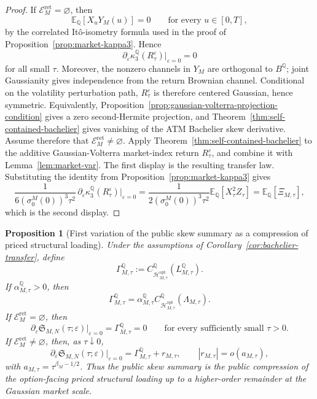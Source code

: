 \documentclass[11pt,a4paper]{amsart}
\theoremstyle{plain}
\newtheorem{proposition}[theorem]{Proposition}
\theoremstyle{definition}
\theoremstyle{remark}
\newcommand{\QQ}{\mathbb{Q}}
\newcommand{\EE}{\mathbb{E}}
\newcommand{\cH}{\mathcal{H}}
\newcommand{\cE}{\mathcal{E}}
\begin{document}
\begin{proof}
If \(\cE_M^{\mathrm{ret}}=\varnothing\), then
\[
        \EE_\QQ[X_uY_M(u)]=0
        \qquad
        \text{for every }u\in[0,T],
\]
by the correlated It\^o-isometry formula used in the proof of
Proposition~\ref{prop:market-kappa3}.  Hence
\[
        \partial_\varepsilon\kappa_3^\QQ(R_\tau^\varepsilon)\big|_{\varepsilon=0}=0
\]
for all small \(\tau\).  Moreover, the nonzero channels in \(Y_M\) are orthogonal to
\(B^\QQ\); joint Gaussianity gives independence from the return Brownian channel.  Conditional on
the volatility perturbation path, \(R_\tau^\varepsilon\) is therefore centered Gaussian, hence
symmetric.  Equivalently, Proposition~\ref{prop:gaussian-volterra-projection-condition} gives a
zero second-Hermite projection, and Theorem~\ref{thm:self-contained-bachelier} gives vanishing of
the ATM Bachelier skew derivative.  Assume therefore that
\(\cE_M^{\mathrm{ret}}\neq\varnothing\).  Apply
Theorem~\ref{thm:self-contained-bachelier} to the additive Gaussian-Volterra market-index return
\(R_\tau^\varepsilon\), and combine it with Lemma~\ref{lem:market-var}.  The first display is the
resulting transfer law.  Substituting the
identity from Proposition~\ref{prop:market-kappa3} gives
\[
        \frac{1}{6(\sigma_0^M(0))^3\tau^2}\,
        \partial_\varepsilon \kappa_3^\QQ(R_\tau^\varepsilon)\big|_{\varepsilon=0}
        =
        \frac{1}{2(\sigma_0^M(0))^3\tau^2}\EE_\QQ[X_\tau^2 Z_\tau]
        =
        \EE_\QQ[\Xi_{M,\tau}],
\]
which is the second display.
\end{proof}

\begin{proposition}[First variation of the public skew summary as a compression of priced structural loading]\label{prop:option-compression}
Under the assumptions of Corollary~\ref{cor:bachelier-transfer}, define
\[
        \Gamma_{M,\tau}^\QQ
        :=
        C_{\cH_{M,\tau}^{\mathrm{opt}}}^\QQ(L_{M,\tau}^\QQ).
\]
If \(\alpha_{M,\tau}^\QQ>0\), then
\[
        \Gamma_{M,\tau}^\QQ
        =
        \alpha_{M,\tau}^\QQ
        C_{\cH_{M,\tau}^{\mathrm{opt}}}^\QQ(\Lambda_{M,\tau}).
\]
If \(\cE_M^{\mathrm{ret}}=\varnothing\), then
\[
        \partial_\varepsilon
        \mathfrak S_{M,N}(\tau;\varepsilon)\big|_{\varepsilon=0}
        =
        \Gamma_{M,\tau}^\QQ
        =
        0
        \qquad
        \text{for every sufficiently small }\tau>0.
\]
If \(\cE_M^{\mathrm{ret}}\neq\varnothing\), then, as \(\tau\downarrow0\),
\[
        \partial_\varepsilon
        \mathfrak S_{M,N}(\tau;\varepsilon)\big|_{\varepsilon=0}
        =
        \Gamma_{M,\tau}^\QQ
        +
        r_{M,\tau},
        \qquad
        |r_{M,\tau}|=o(a_{M,\tau}),
\]
with \(a_{M,\tau}=\tau^{\beta_M-1/2}\).  Thus the public skew summary is the public compression of
the option-facing priced structural loading up to a higher-order remainder at the Gaussian market
scale.
\end{proposition}
\end{document}
